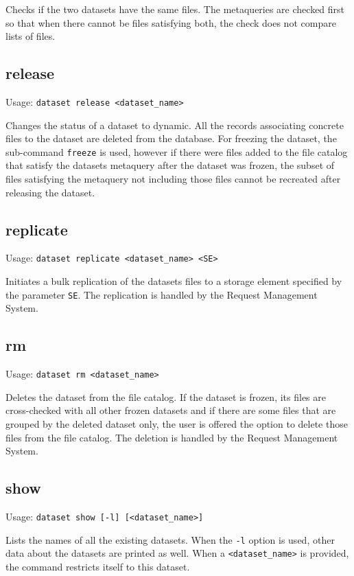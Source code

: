 Checks if the two datasets have the same files. The metaqueries are
checked first so that when there cannot be files satisfying both,
the check does not compare lists of files.

\pagebreak

\subsection{release}

Usage: \texttt{dataset release <dataset\_name>}

Changes the status of a dataset to dynamic. All the records
associating concrete files to the dataset are deleted from the
database. For freezing the dataset, the sub-command \texttt{freeze}
is used, however if there were files added to the file catalog that
satisfy the datasets metaquery after the dataset was frozen, the
subset of files satisfying the metaquery not including those files
cannot be recreated after releasing the dataset.

\subsection{replicate}

Usage: \texttt{dataset replicate <dataset\_name> <SE>}

Initiates a bulk replication of the datasets files to a storage
element specified by the parameter \texttt{SE}. The replication
is handled by the Request Management System.

\subsection{rm}

Usage: \texttt{dataset rm <dataset\_name>}

Deletes the dataset from the file catalog. If the dataset is
frozen, its files are cross-checked with all other frozen datasets
and if there are some files that are grouped by the deleted dataset
only, the user is offered the option to delete those files from the
file catalog. The deletion is handled by the Request Management
System.

\subsection{show}

Usage: \texttt{dataset show [-l] [<dataset\_name>]}

Lists the names of all the existing datasets. When the \texttt{-l}
option is used, other data about the datasets are printed as well.
When a \texttt{<dataset\_name>} is provided, the command restricts
itself to this dataset.

